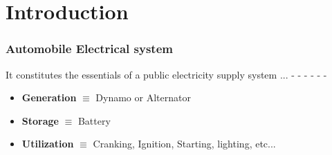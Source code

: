 \documentclass{beamer}
\begin{document}
{ %
    \begin{frame}[plain]
     \end{frame}
}


\section{Introduction}

\begin{frame}   %
  \frametitle{Automobile Electrical system}
  \begin{center}
    It constitutes the essentials of a public electricity supply system ...    
    - - - - - - 
  \end{center}
  \begin{itemize}
    \item \textbf{Generation}   $\equiv$ Dynamo or Alternator
    \item \textbf{Storage}      $\equiv$ Battery
    \item \textbf{Utilization}  $\equiv$ Cranking, Ignition, Starting, lighting, etc...
  \end{itemize}
\end{frame}
\end{document}
